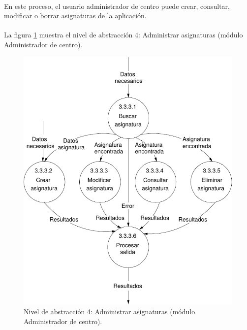 \paragraph{}En este proceso, el usuario administrador de centro puede crear,
consultar, modificar o borrar asignaturas de la aplicación.

\paragraph{}La figura \ref{diagramaNivel4-AdministrarAsignaturas-admCentro}
muestra el nivel de abstracción 4: Administrar asignaturas (módulo Administrador
de centro).

  \begin{figure}[!ht]
    \begin{center}
      \includegraphics[]{08.Analisis_Funcional/8.2.DFDs/Niveles/Nivel4/AdministradorCentro/AdministrarAsignaturas/Diagramas/nivel4-AdministrarAsignaturas.pdf}
      \caption{Nivel de abstracción 4: Administrar asignaturas (módulo Administrador de centro).}
      \label{diagramaNivel4-AdministrarAsignaturas-admCentro}
    \end{center}
  \end{figure}

